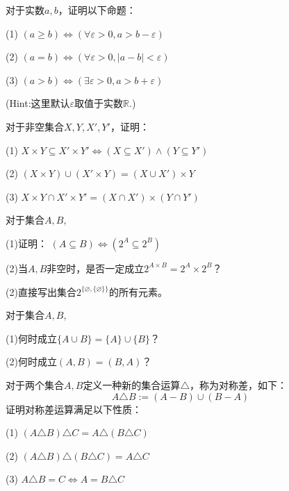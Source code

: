 \begin{prob}对于实数$a,b$，证明以下命题：

(1) $(a\geq b)\Leftrightarrow(\forall\varepsilon>0,a>b-\varepsilon)$

(2) $(a=b)\Leftrightarrow(\forall\varepsilon>0,|a-b|<\varepsilon)$

(3) $(a>b)\Leftrightarrow(\exists\varepsilon>0,a>b+\varepsilon)$

\end{prob}

(Hint:这里默认$\varepsilon$取值于实数$\mathbb{R}$.)\vs

\begin{prob}对于非空集合$X,Y,X',Y'$，证明：

(1) $X\times Y\subseteq X'\times Y' \Leftrightarrow (X\subseteq X')\wedge(Y\subseteq Y')$

(2) $(X\times Y)\cup(X'\times Y)=(X\cup X')\times Y$

(3) $X\times Y\cap X'\times Y'=(X\cap X')\times(Y\cap Y')$
\end{prob}\vs

\begin{prob} 对于集合$A,B$,

(1)证明： $(A\subseteq B)\Leftrightarrow (2^A\subseteq 2^B)$

(2)当$A,B$非空时，是否一定成立$2^{A\times B}=2^A\times2^B$？

(2)直接写出集合$2^{\{\varnothing,\{\varnothing\}\}}$的所有元素。

\end{prob}\vs

\begin{prob}对于集合$A,B$,

(1)何时成立$\{A\cup B\}=\{A\}\cup\{B\}$？

(2)何时成立$(A,B)=(B,A)$？
\end{prob}\vs

\begin{prob}[集合的对称差]

对于两个集合$A,B$定义一种新的集合运算$\triangle$，称为对称差，如下：
$$A\triangle B:=(A-B)\cup(B-A)$$
证明对称差运算满足以下性质：

(1) $(A\triangle B)\triangle C=A\triangle(B\triangle C)$

(2) $(A\triangle B)\triangle (B\triangle C)=A\triangle C$

(3) $A\triangle B=C\Leftrightarrow A=B\triangle C$
\end{prob}
